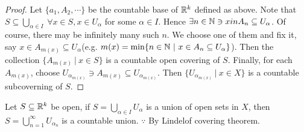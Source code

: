 \begin{proof}
	Let $\{a_1,A_2,\cdots\}$ be the countable base of $\mathbb{R}^k$ defined as above. Note that $S \subseteq \bigcup_{\alpha \in I}~\forall x \in S,x \in U_{\alpha}$ for some $\alpha \in I$. Hence $\exists n \in \mathbb{N} \ni x in A_n \subseteq U_\alpha$. Of course, there may be infinitely many such $n$. We choose one of them and fix it, say $x \in A_{m(x)} \subseteq U_{\alpha}$(e.g. $m(x) = \min \{ n \in \mathbb{N} ~|~ x \in A_n \subseteq U_\alpha\}$). Then the collection $\{A_{m(x)}~|~x \in S\}$ is a countable open covering of $S$. Finally, for each $A_{m(x)}$, choose $U_{\alpha_{m(x)}} \ni A_{m(x)} \subseteq U_{\alpha_{m(x)}}$. Then $\{U_{\alpha_{m(x)}}~|~ x \in X\}$ is a countable subcoverning of $S$.
\end{proof}

\begin{cor}
	Let $S \subseteq \mathbb{R}^k$ be open, if $S = \bigcup_{\alpha \in I}U_\alpha $ is a union of open sets in $X$, then $S = \bigcup^{\infty}_{n = 1}U_{\alpha_n}$ is a countable union. $\because$ By Lindelof covering theorem.	
\end{cor}

































